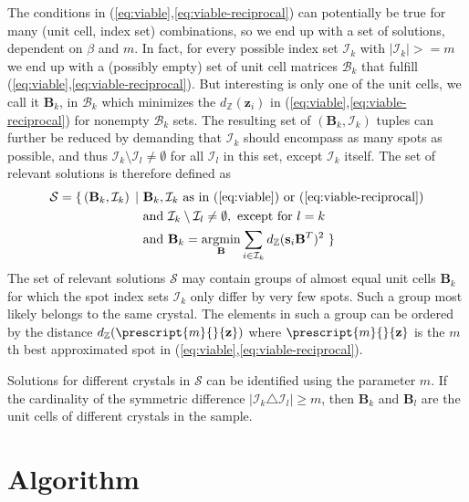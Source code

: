\documentclass[a4paper,10pt]{article}
\DeclareMathOperator*{\argmin}{argmin}
\newcommand{\vect}[1]{\mathbf{#1}}
\newcommand{\mat}[1]{\mathbf{#1}}
\newcommand{\distZ}[1]{d_\mathbb{Z}(#1)}
\begin{document}
%
The conditions in (\ref{eq:viable},\ref{eq:viable-reciprocal}) can potentially be true for many (unit cell, index set) combinations, so we end up with a set of solutions, dependent on $\beta$ and $m$. In fact, for every possible index set $\mathcal{I}_k$ with $|\mathcal{I}_k| >= m$ we end up with a (possibly empty) set of unit cell matrices $\mathcal{B}_k$ that fulfill (\ref{eq:viable},\ref{eq:viable-reciprocal}). But interesting is only one of the unit cells, we call it $\mat{B}_k$, in $\mathcal{B}_k$ which minimizes the $\distZ{\vect{z}_i}$ in (\ref{eq:viable},\ref{eq:viable-reciprocal}) for nonempty $\mathcal{B}_k$ sets. The resulting set of $(\mat{B}_k, \mathcal{I}_k)$ tuples can further be reduced by demanding that $\mathcal{I}_k$ should encompass as many spots as possible, and thus $\mathcal{I}_k \setminus \mathcal{I}_l \neq \emptyset$ for all $\mathcal{I}_l$ in this set, except $\mathcal{I}_k$ itself. The set of relevant solutions is therefore defined as
%
\begin{equation}\label{eq:solution-set}
 \begin{split}
  \mathcal{S} = \{\, (\mat{B}_k, \mathcal{I}_k)\,\mid\ &\mat{B}_k, \mathcal{I}_k\text{ as in (\ref{eq:viable}) or (\ref{eq:viable-reciprocal})} \\
  &\text{and }\mathcal{I}_k \setminus \mathcal{I}_l \neq \emptyset,\text{ except for }l=k \\
  &\text{and }\mat{B}_k = \argmin_{\mat{B}} \sum_{i \in \mathcal{I}_k} \distZ{\vect{s}_i \mat{B}^T}^2\ \}
 \end{split}
\end{equation}
%
The set of relevant solutions $\mathcal{S}$ may contain groups of almost equal unit cells $\mat{B}_k$ for which the spot index sets $\mathcal{I}_k$ only differ by very few spots. Such a group most likely belongs to the same crystal. The elements in such a group can be ordered by the distance $\distZ{\prescript{m}{}{\vect{z}}}$ where $\prescript{m}{}{\vect{z}}$ is the $m$th best approximated spot in (\ref{eq:viable},\ref{eq:viable-reciprocal}).

Solutions for different crystals in $\mathcal{S}$ can be identified using the parameter $m$. If the cardinality of the symmetric difference $|\mathcal{I}_k \triangle \mathcal{I}_l | \geq m$, then $\mat{B}_k$ and $\mat{B}_l$ are the unit cells of different crystals in the sample.

\section{Algorithm}
\end{document}
